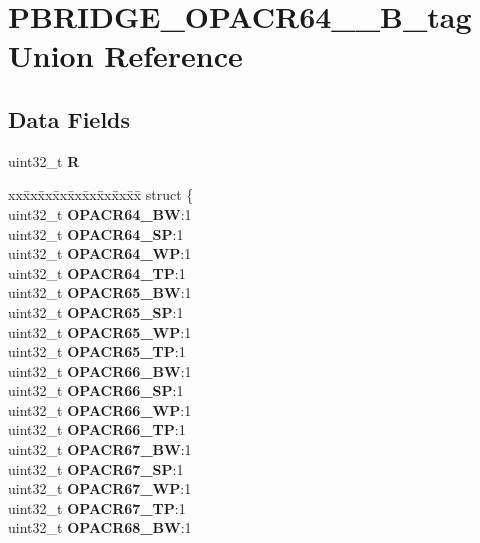 \hypertarget{unionPBRIDGE__OPACR64__71__32B__tag}{}\section{P\+B\+R\+I\+D\+G\+E\+\_\+\+O\+P\+A\+C\+R64\+\_\+\_\+B\+\_\+tag Union Reference}
\label{unionPBRIDGE__OPACR64__71__32B__tag}
\subsection*{Data Fields}
\begin{DoxyCompactItemize}
\item 
\mbox{\label{unionPBRIDGE__OPACR64__71__32B__tag_afcedba8f6254812d5b11a25565881cd6}} 
uint32\+\_\+t {\bfseries R}
\item 
\mbox{\label{unionPBRIDGE__OPACR64__71__32B__tag_aaf42d8aa97fa3b842abdc7d947df770b}} 
\begin{tabbing}
xx\=xx\=xx\=xx\=xx\=xx\=xx\=xx\=xx\=\kill
struct \{\\
\>uint32\_t {\bfseries OPACR64\_BW}:1\\
\>uint32\_t {\bfseries OPACR64\_SP}:1\\
\>uint32\_t {\bfseries OPACR64\_WP}:1\\
\>uint32\_t {\bfseries OPACR64\_TP}:1\\
\>uint32\_t {\bfseries OPACR65\_BW}:1\\
\>uint32\_t {\bfseries OPACR65\_SP}:1\\
\>uint32\_t {\bfseries OPACR65\_WP}:1\\
\>uint32\_t {\bfseries OPACR65\_TP}:1\\
\>uint32\_t {\bfseries OPACR66\_BW}:1\\
\>uint32\_t {\bfseries OPACR66\_SP}:1\\
\>uint32\_t {\bfseries OPACR66\_WP}:1\\
\>uint32\_t {\bfseries OPACR66\_TP}:1\\
\>uint32\_t {\bfseries OPACR67\_BW}:1\\
\>uint32\_t {\bfseries OPACR67\_SP}:1\\
\>uint32\_t {\bfseries OPACR67\_WP}:1\\
\>uint32\_t {\bfseries OPACR67\_TP}:1\\
\>uint32\_t {\bfseries OPACR68\_BW}:1\\

\end{tabbing}
\end{DoxyCompactItemize}
